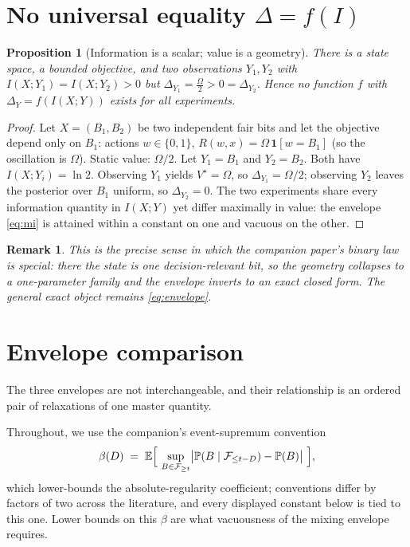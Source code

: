 \documentclass[11pt]{article}
\newtheorem{proposition}[theorem]{Proposition}
\newtheorem{remark}[theorem]{Remark}
\newcommand{\E}{\mathbb{E}}
\begin{document}
\section{No universal equality \texorpdfstring{$\Delta=f(I)$}{Delta=f(I)}}
\label{sec:noequality}

\begin{proposition}[Information is a scalar; value is a geometry]
\label{prop:noneq}
There is a state space, a bounded objective, and two observations
$Y_1, Y_2$ with $I(X;Y_1)=I(X;Y_2)>0$ but
$\Delta_{Y_1}=\tfrac{\Omega}{2}>0=\Delta_{Y_2}$. Hence no
function $f$ with $\Delta_Y=f(I(X;Y))$ exists for all experiments.
\end{proposition}

\begin{proof}
Let $X=(B_1,B_2)$ be two independent fair bits and let the objective depend
only on $B_1$: actions $w\in\{0,1\}$, $R(w,x)=\Omega\,\mathbf 1[w=B_1]$
(so the oscillation is $\Omega$). Static value: $\Omega/2$. Let $Y_1=B_1$
and $Y_2=B_2$. Both have $I(X;Y_i)=\ln 2$. Observing $Y_1$ yields
$V^\star=\Omega$, so $\Delta_{Y_1}=\Omega/2$; observing $Y_2$ leaves the
posterior over $B_1$ uniform, so $\Delta_{Y_2}=0$. The two experiments share
every information quantity in $I(X;Y)$ yet differ maximally in value: the
envelope \eqref{eq:mi} is attained within a constant on one and vacuous on
the other.
\end{proof}

\begin{remark}
This is the precise sense in which the companion paper's binary law is
special: there the state is one decision-relevant bit, so the geometry
collapses to a one-parameter family and the envelope inverts to an exact
closed form. The general exact object remains \eqref{eq:envelope}.
\end{remark}

\section{Envelope comparison}\label{sec:comparison}

The three envelopes are not interchangeable, and their relationship is an
ordered pair of relaxations of one master quantity.

Throughout, we use the companion's event-supremum convention
\[
\beta(D)\;=\;\E\Bigl[\ \sup_{B\in\mathcal F_{\ge t}}
\bigl|\mathbb P(B\mid\mathcal F_{\le t-D})-\mathbb P(B)\bigr|\ \Bigr],
\]
which lower-bounds the absolute-regularity coefficient; conventions differ
by factors of two across the literature, and every displayed constant below
is tied to this one. Lower bounds on this $\beta$ are what vacuousness of
the mixing envelope requires.
\end{document}
